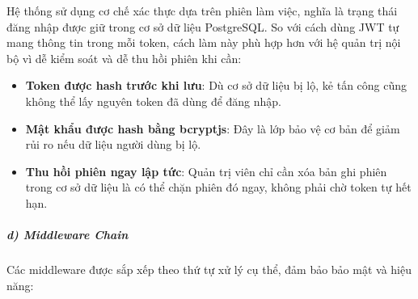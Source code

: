 \documentclass[a4paper]{extarticle}
\providecommand{\tightlist}{%
  \setlength{\itemsep}{0pt}\setlength{\parskip}{0pt}}
\begin{document}
Hệ thống sử dụng cơ chế xác thực dựa trên phiên làm việc, nghĩa là trạng
thái đăng nhập được giữ trong cơ sở dữ liệu PostgreSQL. So với cách dùng
JWT tự mang thông tin trong mỗi token, cách làm này phù hợp hơn với hệ
quản trị nội bộ vì dễ kiểm soát và dễ thu hồi phiên khi cần:

\begin{itemize}
\tightlist
\item
  \textbf{Token được hash trước khi lưu}: Dù cơ sở dữ liệu bị lộ, kẻ tấn
  công cũng không thể lấy nguyên token đã dùng để đăng nhập.
\item
  \textbf{Mật khẩu được hash bằng bcryptjs}: Đây là lớp bảo vệ cơ bản để
  giảm rủi ro nếu dữ liệu người dùng bị lộ.
\item
  \textbf{Thu hồi phiên ngay lập tức}: Quản trị viên chỉ cần xóa bản ghi
  phiên trong cơ sở dữ liệu là có thể chặn phiên đó ngay, không phải chờ
  token tự hết hạn.
\end{itemize}

\subparagraph{d) Middleware Chain}\label{d-middleware-chain}

Các middleware được sắp xếp theo thứ tự xử lý cụ thể, đảm bảo bảo mật và
hiệu năng:
\end{document}
